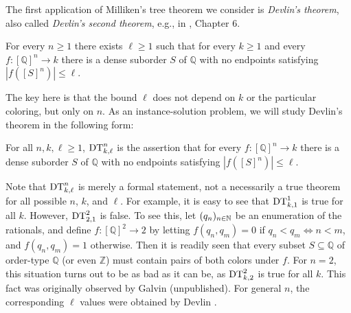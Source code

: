 The first application of Milliken's tree theorem we consider is \emph{Devlin's theorem}, also called \emph{Devlin's second theorem}, e.g., in \cite{Todorcevic2010Ramsey}, Chapter 6.
\begin{theorem}
	For every $n \geq 1$ there exists $\ell \geq 1$ such that for every $k \geq 1$ and every $f: [\mathbb{Q}]^n \to k$ there is a dense suborder $S$ of $\mathbb{Q}$ with no endpoints satisfying $|f ([S]^n)| \leq \ell$.
\end{theorem}

\noindent The key here is that the bound $\ell$ does not depend on $k$ or the particular coloring, but only on $n$. As an instance-solution problem, we will study Devlin's theorem in the following form:

\begin{statement}
  For all $n, k, \ell \geq 1$, $\mathrm{DT}^{n}_{k,\ell}$ is the assertion that for every $f: [\mathbb Q]^n \to k$ there is a dense suborder $S$ of $\mathbb{Q}$ with no endpoints satisfying $|f ([S]^n)| \leq \ell$.
\end{statement}

\noindent Note that $\mathrm{DT}^{n}_{k,\ell}$ is merely a formal statement, not a necessarily a true theorem for all possible $n$, $k$, and $\ell$. For example, it is easy to see that $\mathrm{DT}^{1}_{k,1}$ is true for all $k$. However, $\mathrm{DT}^{2}_{2,1}$ is false. 
To see this, let $(q_n)_{n\in\mathbb{N}}$ be an enumeration of the rationals, and define $f: [\mathbb Q]^2\to 2$ by letting $f(q_n, q_m) = 0$ if $q_n<q_m\iff n<m$, and $f(q_n, q_m) = 1$ otherwise. Then it is readily seen that every subset $S\subseteq\mathbb Q$ of order-type $\mathbb Q$ (or even $\mathbb Z$) must contain pairs of both colors under $f$. For $n = 2$, this situation turns out to be as bad as it can be, as $\mathrm{DT}^{2}_{k,2}$ is true for all $k$. This fact was originally observed by Galvin (unpublished). For general $n$, the corresponding $\ell$ values were obtained by Devlin \cite[Chapter 4]{Devlin1980}.

